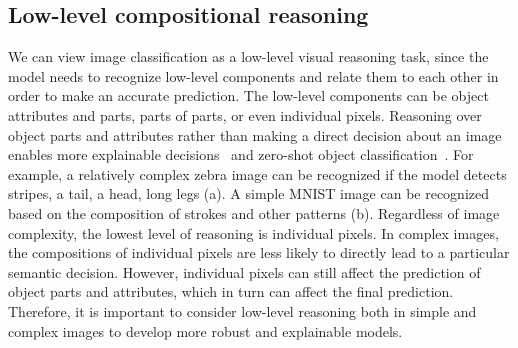 \subsection{Low-level compositional reasoning\label{sec:bg_low}}
We can view image classification as a low-level visual reasoning task, since the model needs to recognize low-level components and relate them to each other in order to make an accurate prediction.
The low-level components can be object attributes and parts, parts of parts, or even individual pixels.
Reasoning over object parts and attributes rather than making a direct decision about an image enables more explainable decisions~\citep{ul2019explaining} and zero-shot object classification~\citep{lampert2013attribute,demirel2017attributes2classname,naeem2021learning,tokmakov2019learning}. 
For example, a relatively complex zebra image can be recognized if the model detects stripes, a tail, a head, long legs (\fig{\ref{fig:attrib}}a). A simple MNIST image can be recognized based on the composition of strokes and other patterns (\fig{\ref{fig:attrib}}b).
Regardless of image complexity, the lowest level of reasoning is individual pixels. In complex images, the compositions of individual pixels are less likely to directly lead to a particular semantic decision. However, individual pixels can still affect the prediction of object parts and attributes, which in turn can affect the final prediction. Therefore, it is important to consider low-level reasoning both in simple and complex images to develop more robust and explainable models.


